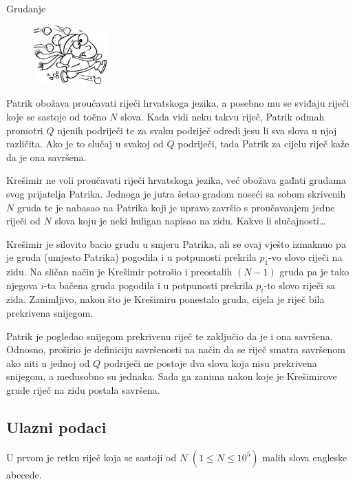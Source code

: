\begin{statement}[
  problempoints=70,
  timelimit=1 sekunda,
  memorylimit=512 MiB,
]{Grudanje}

\setlength\intextsep{-0.1cm}
\begin{figure}
\centering
\includegraphics[width=0.25\textwidth]{img/gruda.png}
\end{figure}

Patrik obožava proučavati riječi hrvatskoga jezika, a posebno mu se sviđaju
riječi koje se sastoje od točno $N$ slova. Kada vidi neku takvu riječ, Patrik
odmah promotri $Q$ njenih podriječi te za svaku podriječ odredi jesu li sva
slova u njoj različita. Ako je to slučaj u svakoj od $Q$ podriječi, tada Patrik
za cijelu riječ kaže da je ona savršena.

Krešimir ne voli proučavati riječi hrvatskoga jezika, već obožava gađati
grudama svog prijatelja Patrika. Jednoga je jutra šetao gradom noseći sa
sobom skrivenih $N$ gruda te je nabasao na Patrika koji je upravo završio s
proučavanjem jedne riječi od $N$ slova koju je neki huligan napisao na zidu.
Kakve li slučajnosti\dots

Krešimir je silovito bacio grudu u smjeru Patrika, ali se ovaj vješto
izmaknuo pa je gruda (umjesto Patrika) pogodila i u potpunosti prekrila $p_1$-vo
slovo riječi na zidu. Na sličan način je Krešimir potrošio i preostalih $(N-1)$
gruda pa je tako njegova $i$-ta bačena gruda pogodila i u potpunosti prekrila
$p_i$-to slovo riječi sa zida. Zanimljivo, nakon što je Krešimiru ponestalo
gruda, cijela je riječ bila prekrivena snijegom.

Patrik je pogledao snijegom prekrivenu riječ te zaključio da je i ona savršena.
Odnosno, proširio je definiciju savršenosti na način da se riječ smatra
savršenom ako niti u jednoj od $Q$ podriječi ne postoje dva slova koja nisu
prekrivena snijegom, a međusobno su jednaka. Sada ga zanima nakon koje je
Krešimirove grude riječ na zidu postala savršena.

\subsection*{Ulazni podaci}
U prvom je retku riječ koja se sastoji od $N$ $(1 \le N \le 10^5)$ malih slova
engleske abecede.


\end{statement}
